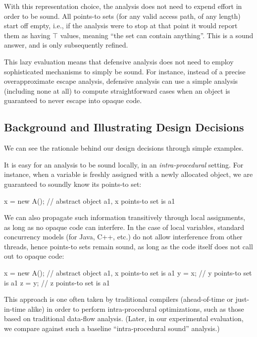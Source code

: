 With this representation choice, the analysis does not need to expend effort in order to be sound. All points-to sets (for any valid access path, of any length) start off empty, i.e., if the analysis were to stop at that point it would report them as having $\top$ values, meaning ``the set can contain anything''. This is a sound answer, and is only subsequently refined.

This lazy evaluation means that defensive analysis does not need to employ sophisticated mechanisms to simply be sound. For instance, instead of a precise overapproximate escape analysis, defensive analysis can use a simple analysis (including none at all) to compute straightforward cases when an object is guaranteed to never escape into opaque code.



\subsection{Background and Illustrating Design Decisions}
\label{sec:sound:principles}

We can see the rationale behind our design decisions through simple examples.

It is easy for an analysis to be sound locally, in an \emph{intra-procedural} setting. For instance, when a variable is freshly assigned with a newly allocated object, we are guaranteed to soundly know its points-to set:

\begin{javaBox}
x = new A();  // abstract object a1, x points-to set is {a1}
\end{javaBox}

We can also propagate such information transitively through local assignments, as long as no opaque code can interfere. In the case of local variables, standard concurrency models (for Java, C++, etc.) do not allow interference from other threads, hence points-to sets remain sound, as long as the code itself does not call out to opaque code:

\begin{javaBox}
x = new A();  // abstract object a1, x points-to set is {a1}
y = x;        // y points-to set is {a1}
z = y;        // z points-to set is {a1}
\end{javaBox}

This approach is one often taken by traditional compilers (ahead-of-time or just-in-time alike) in order to perform intra-procedural optimizations, such as those based on traditional data-flow analysis. (Later, in our experimental evaluation, we compare against such a baseline ``intra-procedural sound'' analysis.)

